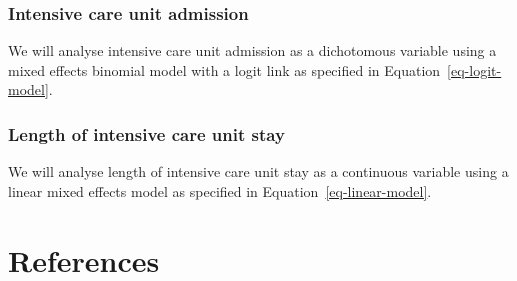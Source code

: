 \documentclass[
]{scrartcl}
\begin{document}
\hypertarget{intensive-care-unit-admission}{%
\subsubsection{Intensive care unit
admission}\label{intensive-care-unit-admission}}

We will analyse intensive care unit admission as a dichotomous variable
using a mixed effects binomial model with a logit link as specified in
Equation~\ref{eq-logit-model}.

\hypertarget{length-of-intensive-care-unit-stay}{%
\subsubsection{Length of intensive care unit
stay}\label{length-of-intensive-care-unit-stay}}

We will analyse length of intensive care unit stay as a continuous
variable using a linear mixed effects model as specified in
Equation~\ref{eq-linear-model}.

\hypertarget{references}{%
\section*{References}\label{references}}
\end{document}
